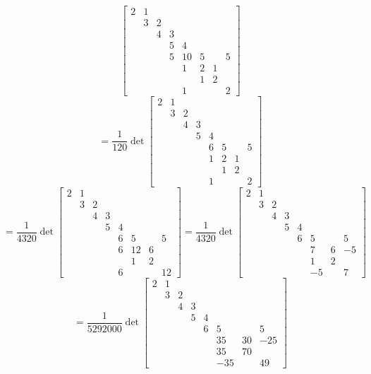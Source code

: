 \begin{itemize}
$$\begin{bmatrix}
2 & 1 \\
& 3 & 2 \\
& & 4 & 3 \\
& & & 5 & 4 \\
& & & 5 & 10 & 5 & & 5\\
& & & & 1 & 2 & 1 \\
& & & & & 1 & 2 \\
& & & & 1 & & & 2
\end{bmatrix}$$
$$= \frac{1}{120}\det\begin{bmatrix}
2 & 1 \\
& 3 & 2 \\
& & 4 & 3 \\
& & & 5 & 4 \\
& & & & 6 & 5 & & 5\\
& & & & 1 & 2 & 1 \\
& & & & & 1 & 2 \\
& & & & 1 & & & 2
\end{bmatrix}$$
$$= \frac{1}{4320}\det\begin{bmatrix}
2 & 1 \\
& 3 & 2 \\
& & 4 & 3 \\
& & & 5 & 4 \\
& & & & 6 & 5 & & 5\\
& & & & 6 & 12 & 6 \\
& & & & & 1 & 2 \\
& & & & 6 & & & 12
\end{bmatrix} = \frac{1}{4320}\det\begin{bmatrix}
2 & 1 \\
& 3 & 2 \\
& & 4 & 3 \\
& & & 5 & 4 \\
& & & & 6 & 5 & & 5\\
& & & & & 7 & 6 & -5\\
& & & & & 1 & 2 \\
& & & & & -5 & & 7
\end{bmatrix}$$
$$= \frac{1}{5292000}\det\begin{bmatrix}
2 & 1 \\
& 3 & 2 \\
& & 4 & 3 \\
& & & 5 & 4 \\
& & & & 6 & 5 & & 5\\
& & & & & 35 & 30 & -25\\
& & & & & 35 & 70 \\
& & & & & -35 & & 49
\end{bmatrix}$$

\end{itemize}
